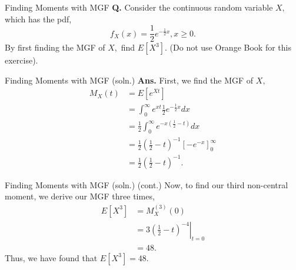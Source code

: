 \documentclass{beamer}
\begin{document}
\begin{frame}{Finding Moments with MGF}
    \textbf{Q.} Consider the continuous random variable $X,$ which has the pdf,
    $$
    f_X(x) = \frac{1}{2} e^{-\frac{1}{2}x}, x\ge 0.
    $$
    By first finding the MGF of $X,$ find $E[X^3].$ (Do not use Orange Book for this exercise).
\end{frame}

\begin{frame}{Finding Moments with MGF (soln.)}
    \textbf{Ans.} First, we find the MGF of $X,$
    \begin{align*}
        M_X(t) &= E\left[ e^{X t} \right] \\
        &= \int_{0}^{\infty} e^{xt} \frac{1}{2} e^{-\frac{1}{2}x} dx\\
        &= \frac{1}{2} \int_{0}^{\infty} e^{-x\left(\frac{1}{2}-t\right)} dx \\
        &= \frac{1}{2} \left(\frac{1}{2}-t\right)^{-1} \left[ -e^{-x} \right]_{0}^{\infty} \\
        &= \frac{1}{2} \left(\frac{1}{2}-t\right)^{-1}.
    \end{align*}
\end{frame}

\begin{frame}{Finding Moments with MGF (soln.) (cont.)}
    Now, to find our third non-central moment, we derive our MGF three times,
    \begin{align*}
        E\left[X^3\right] &= M_X^{(3)} (0) \\
        &= \left. 3 \left(\frac{1}{2}-t\right)^{-4} \right|_{t=0} \\
        &= 48.
    \end{align*}
    Thus, we have found that $E\left[X^3\right] = 48.$
\end{frame}
\end{document}
